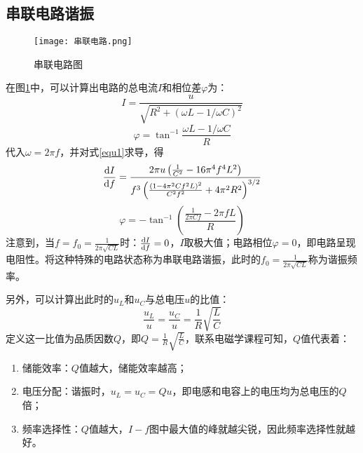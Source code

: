 \documentclass[11pt]{article}
\begin{document}
\subsection{串联电路谐振}
\begin{figure}[h]
	\centering
	\texttt{[image: 串联电路.png]}
	\caption{串联电路图}
	\label{fig:series circuit}
\end{figure}
在图\ref{fig:series circuit}中，可以计算出电路的总电流\(I\)和相位差$\varphi$为：
\begin{equation}\label{equ1}
	I=\frac{u}{\sqrt{R^2+(\omega L-1/\omega C)^2}}
\end{equation}
\begin{equation}
	\varphi=\tan^{-1} \frac{\omega L-1/\omega C}{R}
\end{equation}
代入\(\omega=2\pi f\)，并对式\ref{equ1}求导，得
\begin{equation}
	\dv{I}{f}=\frac{2 \pi  u \left(\frac{1}{C^2}-16 \pi ^4 f^4 L^2\right)}{f^3 \left(\frac{\left(1-4 \pi ^2 C f^2 L\right)^2}{C^2 f^2}+4 \pi ^2 R^2\right)^{3/2}}
\end{equation}
\begin{equation}
	\varphi=-\tan ^{-1} \left(\frac{\frac{1}{2 \pi  C f}-2 \pi  f L}{R}\right)
\end{equation}
注意到，当\(f=f_0=\frac{1}{2\pi\sqrt{CL}}\)时：\(	\dv{I}{f}=0\)，\(I\)取极大值；电路相位\(\varphi=0\)，即电路呈现电阻性。将这种特殊的电路状态称为串联电路谐振，此时的\(f_0=\frac{1}{2\pi\sqrt{CL}}\)称为谐振频率。

另外，可以计算出此时的\(u_L\)和\(u_C\)与总电压\(u\)的比值：
\begin{equation}
	\frac{u_L}{u}=\frac{u_C}{u}=\frac{1}{R}\sqrt{\frac{L}{C}}
\end{equation}
定义这一比值为品质因数\(Q\)，即\(Q=\frac{1}{R}\sqrt{\frac{L}{C}}\)，联系电磁学课程可知，\(Q\)值代表着：
\begin{enumerate}
	\item 储能效率：\(Q\)值越大，储能效率越高；
	\item 电压分配：谐振时，\(u_L=u_C=Qu\)，即电感和电容上的电压均为总电压的\(Q\)倍；
	\item 频率选择性：\(Q\)值越大，\(I-f\)图中最大值的峰就越尖锐，因此频率选择性就越好。
\end{enumerate}
\end{document}
